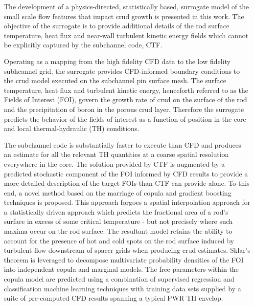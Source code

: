 
\utabstract
{}%
\indent
The development of a physics-directed, statistically based,
surrogate model of the small scale flow features that impact crud growth is presented in this work. 
The objective of the surrogate is to provide additional details of the rod surface temperature, heat
flux and near-wall turbulent kinetic energy fields which cannot be explicitly captured by the subchannel code, CTF. 

Operating as a mapping from the high fidelity CFD data to the low fidelity subhcannel grid, the surrogate provides CFD-informed boundary conditions to the crud model executed on the subchannel pin surface mesh. The surface temperature, heat
flux and turbulent kinetic energy, henceforth referred to as the Fields of Interest (FOI),
govern the growth rate of crud on the surface of the rod and the
precipitation of boron in the porous crud layer. Therefore the surrogate predicts the behavior of the
fields of interest as a function of position in the core and local thermal-hydraulic (TH) conditions.

The subchannel code is substantially faster to execute than CFD
and produces an estimate for all the relevant TH quantities at a coarse spatial resolution everywhere in
the core.  The solution provided by CTF is augmented by a predicted stochastic
component of the FOI informed by CFD results to provide a more detailed description of the target
FOIs than CTF can provide alone.  To this end, a novel method based on the marriage of copula and
gradient boosting techniques is proposed. This approach forgoes a spatial interpolation approach
for a statistically driven approach which predicts the fractional area of a rod’s surface in excess of some
critical temperature - but not precisely where such maxima occur on the rod surface.
The resultant model retains the ability to account for the presence
of hot and cold spots on the rod surface induced by turbulent flow downstream of spacer grids when
producing crud estimates. Sklar’s theorem is leveraged to decompose multivariate probability densities
of the FOI into independent copula and marginal models. The free parameters within the copula model
are predicted using a combination of supervised regression and classification machine learning techniques
with training data sets supplied by a suite of pre-computed CFD results spanning a typical PWR TH
envelop.